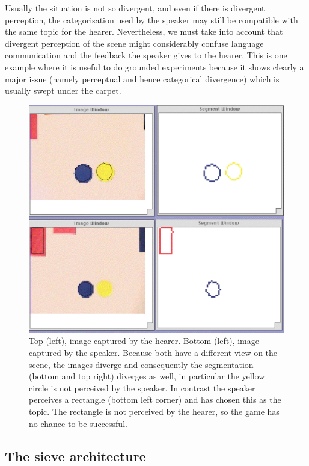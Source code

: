 Usually the situation is not so divergent, and even 
if there is divergent perception, the categorisation
used by the speaker may still be compatible with the 
same topic for the hearer. Nevertheless, we must take into account that divergent perception 
of the scene might considerably confuse language communication and the feedback the speaker gives
to the hearer. This is one example where it is useful to do grounded experiments because it shows 
clearly a major issue (namely perceptual and hence categorical divergence) which is usually swept 
under the carpet. 


\begin{figure}[htbp]
  \centerline{\includegraphics[width=.55\textwidth]{chap3/figs/diff-percept}}
\caption{ Top (left), image captured by the hearer. 
Bottom (left), image captured by the speaker. Because
both have a different view on the scene, the 
images diverge and consequently 
the segmentation (bottom and top right) diverges as well, in particular the yellow 
circle is not perceived by the speaker. In contrast the speaker perceives a rectangle
(bottom left corner) and has chosen this as the topic. The rectangle is not perceived by the 
hearer, so the game has no chance to be successful.}
\label{f:plate12}
\end{figure}

\subsection{The sieve architecture}

